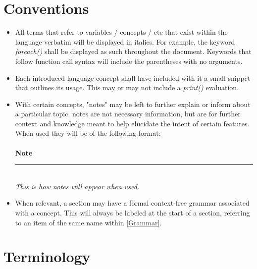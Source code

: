 \documentclass[12pt,letterpaper]{report}
\newcommand{\noteline}{\noindent\textbf{Note}\\\noindent\rule{5cm}{0.4pt}\\}
\begin{document}
\section{Conventions}\label{Conventions}
\begin{itemize}
  \item All terms that refer to variables / concepts / etc that exist within the language verbatim will 
  be displayed in italics. For example, the keyword \textit{foreach()} shall be displayed as such 
  throughout the document. Keywords that follow function call syntax will include the parentheses with 
  no arguments.
  
  \item Each introduced language concept shall have included with it a small snippet that outlines its usage. This 
  may or may not include a \textit{print()} evaluation.

  

  \item With certain concepts, "notes" may be left to further explain or inform about a particular topic. notes are 
        not necessary information, but are for further context and knowledge meant to help elucidate the 
        intent of certain features. When used they will be of the following format:\\\\
  \noteline
  \textit{This is how notes will appear when used.}

  \item When relevant, a section may have a formal context-free grammar associated with a concept.
        This will always be labeled at the start of a section, referring to an item of the same name 
        within \autoref{Grammar}.

\end{itemize}
\section{Terminology}\label{Terminology}
\end{document}
